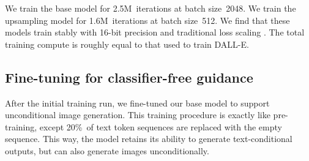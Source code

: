 \documentclass{article}
\begin{document}
We train the base model for 2.5M~iterations at batch size~2048. We train the upsampling model for 1.6M~iterations at batch size~512. We find that these models train stably with 16-bit precision and traditional loss scaling \citep{lossscaling}. The total training compute is roughly equal to that used to train DALL-E.

\subsection{Fine-tuning for classifier-free guidance}

After the initial training run, we fine-tuned our base model to support unconditional image generation. This training procedure is exactly like pre-training, except 20\%~of text token sequences are replaced with the empty sequence. This way, the model retains its ability to generate text-conditional outputs, but can also generate images unconditionally.
\end{document}
